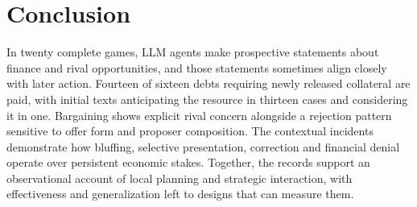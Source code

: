 \section{Conclusion}
In twenty complete games, LLM agents make prospective statements about finance and rival opportunities, and those statements sometimes align closely with later action. Fourteen of sixteen debts requiring newly released collateral are paid, with initial texts anticipating the resource in thirteen cases and considering it in one. Bargaining shows explicit rival concern alongside a rejection pattern sensitive to offer form and proposer composition. The contextual incidents demonstrate how bluffing, selective presentation, correction and financial denial operate over persistent economic stakes. Together, the records support an observational account of local planning and strategic interaction, with effectiveness and generalization left to designs that can measure them.
